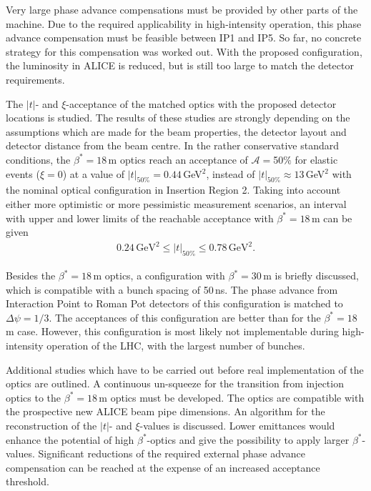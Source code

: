 \newpage

Very large phase advance compensations must be provided by other parts of the machine. Due to the required applicability in high-intensity operation, this phase advance compensation must be feasible between IP1 and IP5. So far, no concrete strategy for this compensation was worked out. With the proposed configuration, the luminosity in ALICE is reduced, but is still too large to match the detector requirements.


The $|t|$- and $\xi$-acceptance of the matched optics with the proposed detector locations is studied. The results of these studies are strongly depending on the assumptions which are made for the beam properties, the detector layout and detector distance from the beam centre. In the rather conservative standard conditions, the $\beta^*=18\,$m optics reach an acceptance of $\mathcal{A}=$50$\%$ for elastic events ($\xi=0$) at a value of $|t|_{50\%}=0.44\,$GeV$^2$, instead of $|t|_{50\%}\approx 13\,$GeV$^2$ with the nominal optical configuration in Insertion Region 2. Taking into account either more optimistic or more pessimistic measurement scenarios, an interval with upper and lower limits of the reachable acceptance with $\beta^*=18\,$m can be given
\begin{align}
0.24\,\text{GeV}^2 \leq |t|_{50\%} \leq 0.78\,\text{GeV}^2.
\end{align} 


Besides the $\beta^*=18\,$m optics, a configuration with $\beta^*=30\,$m is briefly discussed, which is compatible with a bunch spacing of 50$\,$ns. The phase advance from Interaction Point to Roman Pot detectors of this configuration is matched to $\Delta \psi = 1/3$. The acceptances of this configuration are better than for the $\beta^*=18\,$m case. However, this configuration is most likely not implementable during high-intensity operation of the LHC, with the largest number of bunches. 


Additional studies which have to be carried out before real implementation of the optics are outlined. A continuous un-squeeze for the transition from injection optics to the $\beta^*=18\,$m optics must be developed. The optics are compatible with the prospective new ALICE beam pipe dimensions. An algorithm for the reconstruction of the $|t|$- and $\xi$-values is discussed. Lower emittances would enhance the potential of high $\beta^*$-optics and give the possibility to apply larger $\beta^*$-values. Significant reductions of the required external phase advance compensation can be reached at the expense of an increased acceptance threshold.


